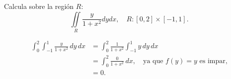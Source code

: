 Calcula sobre la región \( R \):
\[
    \iint\limits_R \frac{y}{1+x^2} dydx,\quad R:[0,2]\times \left[ -1,1 \right].
\]
\begin{solution}
    \begin{align*}
        \int_{0}^2
        \int_{-1}^1
        \frac{y}{1+x^2} \,dy\,dx
        &=
        \int_0^2
        \frac{1}{1+x^2} 
        \int_{-1}^1
        y\,dy
        \,dx\\
        &=
        \int_0^2
        \frac{0}{1+x^2} \,dx,
        \quad\text{ya que $f(y)=y$ es impar,}\\
        &=
        0.
    \end{align*}
\end{solution}

